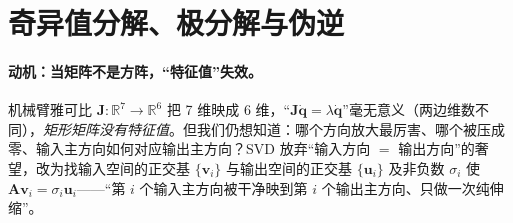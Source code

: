\section{奇异值分解、极分解与伪逆}
\label{sec:svd}

\paragraph{动机：当矩阵不是方阵，“特征值”失效。}
机械臂雅可比 $\mathbf{J}:\mathbb{R}^7\to\mathbb{R}^6$ 把 7 维映成 6 维，“$\mathbf{J}\dot{\mathbf{q}}=\lambda\dot{\mathbf{q}}$”毫无意义（两边维数不同），\emph{矩形矩阵没有特征值}。但我们仍想知道：哪个方向放大最厉害、哪个被压成零、输入主方向如何对应输出主方向？SVD 放弃“输入方向 $=$ 输出方向”的奢望，改为找输入空间的正交基 $\{\mathbf{v}_i\}$ 与输出空间的正交基 $\{\mathbf{u}_i\}$ 及非负数 $\sigma_i$ 使 $\mathbf{A}\mathbf{v}_i=\sigma_i\mathbf{u}_i$——“第 $i$ 个输入主方向被干净映到第 $i$ 个输出主方向、只做一次纯伸缩”。

